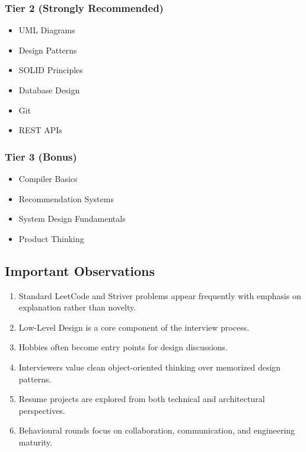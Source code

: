 \documentclass[11pt,a4paper]{article}
\begin{document}
\subsubsection{Tier 2 (Strongly Recommended)}

\begin{itemize}
	\item UML Diagrams
	\item Design Patterns
	\item SOLID Principles
	\item Database Design
	\item Git
	\item REST APIs
\end{itemize}

\subsubsection{Tier 3 (Bonus)}

\begin{itemize}
	\item Compiler Basics
	\item Recommendation Systems
	\item System Design Fundamentals
	\item Product Thinking
\end{itemize}


\subsection{Important Observations}

\begin{enumerate}
	\item Standard LeetCode and Striver problems appear frequently with emphasis on explanation rather than novelty.
	\item Low-Level Design is a core component of the interview process.
	\item Hobbies often become entry points for design discussions.
	\item Interviewers value clean object-oriented thinking over memorized design patterns.
	\item Resume projects are explored from both technical and architectural perspectives.
	\item Behavioural rounds focus on collaboration, communication, and engineering maturity.
\end{enumerate}
\end{document}
